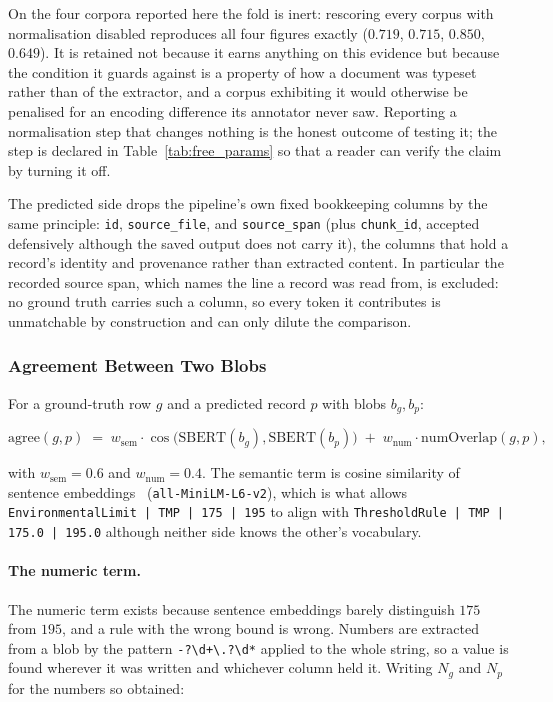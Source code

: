 \documentclass[11pt]{article}
\begin{document}
On the four corpora reported here the fold is inert: rescoring every corpus with
normalisation disabled reproduces all four figures exactly
($0.719$, $0.715$, $0.850$, $0.649$). It is retained not because it earns
anything on this evidence but because the condition it guards against is a
property of how a document was typeset rather than of the extractor, and a
corpus exhibiting it would otherwise be penalised for an encoding difference its
annotator never saw. Reporting a normalisation step that changes nothing is the
honest outcome of testing it; the step is declared in
Table~\ref{tab:free_params} so that a reader can verify the claim by turning it
off.

The predicted side drops the pipeline's own fixed bookkeeping columns by the same
principle: \texttt{id}, \texttt{source\_file}, and \texttt{source\_span} (plus
\texttt{chunk\_id}, accepted defensively although the saved output does not
carry it), the columns that hold a record's identity and provenance rather than
extracted content. In particular the recorded source
span, which names the line a record
was read from, is excluded: no ground truth carries such a column, so every token
it contributes is unmatchable by construction and can only dilute the comparison.

\subsubsection{Agreement Between Two Blobs}
For a ground-truth row $g$ and a predicted record $p$ with blobs $b_g, b_p$:

\begin{equation}
\label{eq:agreement}
\mathrm{agree}(g,p) \;=\; w_{\text{sem}} \cdot \cos\!\big(\mathrm{SBERT}(b_g), \mathrm{SBERT}(b_p)\big)
\;+\; w_{\text{num}} \cdot \mathrm{numOverlap}(g,p),
\end{equation}

with $w_{\text{sem}} = 0.6$ and $w_{\text{num}} = 0.4$. The semantic term is
cosine similarity of sentence embeddings~\cite{reimers2019sbert}
(\texttt{all-MiniLM-L6-v2}), which is what allows
\texttt{EnvironmentalLimit\,|\,TMP\,|\,175\,|\,195} to align with
\texttt{ThresholdRule\,|\,TMP\,|\,175.0\,|\,195.0} although neither side knows
the other's vocabulary.

\paragraph{The numeric term.}
\label{sec:numeric}
The numeric term exists because sentence embeddings barely distinguish $175$ from
$195$, and a rule with the wrong bound is wrong. Numbers are extracted from a blob
by the pattern \texttt{-?\textbackslash d+\textbackslash .?\textbackslash d*}
applied to the whole string, so a value is found wherever it was written and
whichever column held it. Writing $N_g$ and $N_p$ for the numbers so obtained:
\end{document}
